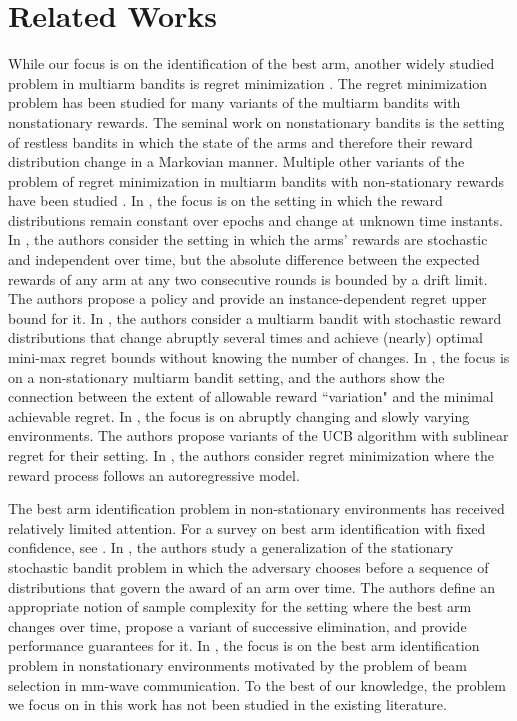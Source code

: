 \section{Related Works}
While our focus is on the identification of the best arm, another widely studied problem in multiarm bandits is regret minimization \cite{lattimore2020bandit,auer2010ucb}. The regret minimization problem has been studied for many variants of the multiarm bandits with nonstationary rewards. The seminal work on nonstationary bandits is the setting of restless bandits \cite{whittle1988restless} in which the state of the arms and therefore their reward distribution change in a Markovian manner. Multiple other variants of the problem of regret minimization in multiarm bandits with non-stationary rewards have been studied \cite{garivier2008upper, krishnamurthy2021slowly, auer2019adaptively, besbes2014stochastic, wei2018abruptly,bacchiocchi2024autoregressive}. In \cite{garivier2008upper}, the focus is on the setting in which the reward distributions remain constant over epochs and change at unknown time instants. In \cite{krishnamurthy2021slowly}, the authors consider the setting in which the arms' rewards are stochastic and independent over time, but the absolute difference between the expected rewards of any arm at any two consecutive rounds is bounded by a drift limit. The authors propose a policy and provide an instance-dependent regret upper bound for it. In \cite{auer2019adaptively}, the authors consider a multiarm bandit with stochastic reward
distributions that change abruptly several times and achieve (nearly) optimal mini-max regret bounds without knowing the number of changes. In \cite{besbes2014stochastic}, the focus is on a non-stationary multiarm bandit setting, and the authors show the connection between the extent
of allowable reward ``variation" and the minimal achievable regret. In \cite{wei2018abruptly}, the focus is on abruptly changing and slowly varying environments. The authors propose variants of the UCB algorithm with sublinear regret for their setting. In \cite{bacchiocchi2024autoregressive}, the authors consider regret minimization where the reward process follows an autoregressive model.

The best arm identification problem in non-stationary environments has received relatively limited attention. For a survey on  best arm identification with fixed confidence, see \cite{jamieson2014best}. In \cite{allesiardo2017non}, the authors study a generalization of the stationary stochastic bandit problem in which the adversary chooses before a sequence of distributions that govern the award of an arm over time. The authors define an appropriate notion of sample complexity for the setting where the best arm changes over time, propose a variant of successive elimination, and provide performance guarantees for it. In \cite{ghatak2024best}, the focus is on the best arm identification problem in nonstationary environments motivated by the problem of beam selection in mm-wave communication. To the best of our knowledge, the problem we focus on in this work has not been studied in the existing literature. 
\color{black}